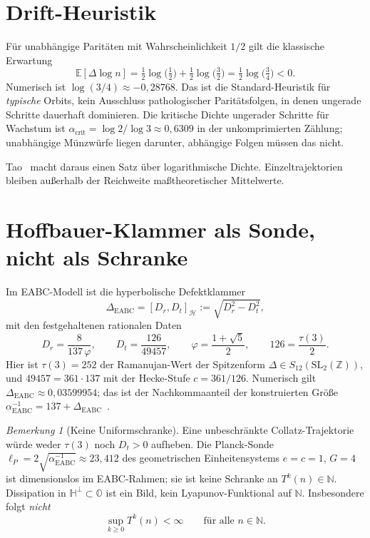 \documentclass[11pt,a4paper]{article}
\theoremstyle{definition}
\theoremstyle{remark}
\newtheorem{remark}[theorem]{Bemerkung}
\numberwithin{equation}{section}
\begin{document}
\section{Drift-Heuristik}

F\"ur unabh\"angige Parit\"aten mit Wahrscheinlichkeit \(1/2\) gilt die klassische Erwartung
\begin{equation}
\mathbb{E}[\Delta\log n]
=\tfrac12\log\bigl(\tfrac12\bigr)+\tfrac12\log\bigl(\tfrac32\bigr)
=\tfrac12\log\bigl(\tfrac34\bigr)<0.
\end{equation}
Numerisch ist \(\log(3/4)\approx -0{,}28768\).
Das ist die Standard-Heuristik f\"ur \emph{typische} Orbits, kein Ausschluss pathologischer
Parit\"atsfolgen, in denen ungerade Schritte dauerhaft dominieren.
Die kritische Dichte ungerader Schritte f\"ur Wachstum ist
\(\alpha_{\mathrm{crit}}=\log 2/\log 3\approx 0{,}6309\)
in der unkomprimierten Z\"ahlung; unabh\"angige M\"unzw\"urfe liegen darunter, abh\"angige
Folgen m\"ussen das nicht.

Tao~\cite{Tao2019} macht daraus einen Satz \"uber logarithmische Dichte.
Einzeltrajektorien bleiben außerhalb der Reichweite maßtheoretischer Mittelwerte.

\section{Hoffbauer-Klammer als Sonde, nicht als Schranke}

Im EABC-Modell ist die hyperbolische Defektklammer
\begin{equation}
\Delta_{\mathrm{EABC}}
=[D_r,D_t]_{\mathcal{H}}
:=\sqrt{D_r^2-D_t^2},
\end{equation}
mit den festgehaltenen rationalen Daten
\begin{equation}
D_r=\frac{8}{137\,\varphi},\qquad
D_t=\frac{126}{49457},\qquad
\varphi=\frac{1+\sqrt{5}}{2},\qquad
126=\frac{\tau(3)}{2}.
\end{equation}
Hier ist \(\tau(3)=252\) der Ramanujan-Wert der Spitzenform \(\Delta\in S_{12}(\mathrm{SL}_2(\mathbb{Z}))\),
und \(49457=361\cdot 137\) mit der Hecke-Stufe \(c=361/126\).
Numerisch gilt \(\Delta_{\mathrm{EABC}}\approx 0{,}03599954\); das ist der Nachkommaanteil
der konstruierten Größe \(\alpha^{-1}_{\mathrm{EABC}}=137+\Delta_{\mathrm{EABC}}\)~\cite{EABC2026}.

\begin{remark}[Keine Uniformschranke]
Eine unbeschr\"ankte Collatz-Trajektorie w\"urde weder \(\tau(3)\) noch \(D_t>0\) aufheben.
Die Planck-Sonde \(\ell_P=2\sqrt{\alpha^{-1}_{\mathrm{EABC}}}\approx 23{,}412\) des geometrischen
Einheitensystems \(e=c=1\), \(G=4\) ist dimensionslos im EABC-Rahmen; sie ist keine Schranke
an \(T^k(n)\in\mathbb{N}\).
Dissipation in \(\mathbb{H}^\perp\subset\mathbb{O}\) ist ein Bild, kein Lyapunov-Funktional
auf \(\mathbb{N}\).
Insbesondere folgt \emph{nicht}
\[
\sup_{k\ge 0}T^k(n)<\infty\qquad\text{f\"ur alle }n\in\mathbb{N}.
\]
\end{remark}
\end{document}
